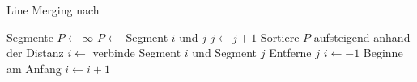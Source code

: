 \begin{algorithm}[!ht]
\caption{Line Merging nach \citeauthor{hirzer08}}
\label{alg:linemerging-hirzer}
\begin{algorithmic}[1]
	\Require Segmente
	\State $P \gets \infty$
						\State $P \gets$ Segment $i$ und $j$
					\EndIf
				\EndIf
			\EndIf
			\State $j \gets j + 1$
		\EndFor
		\State Sortiere $P$ aufsteigend anhand der Distanz
			\State $i \gets$ verbinde Segment $i$ und Segment $j$
			\State Entferne $j$
			\State $i \gets -1$
			\Comment Beginne am Anfang
		\EndFor
		\State $i \gets i + 1$
	\EndFor
\end{algorithmic}
\end{algorithm}
